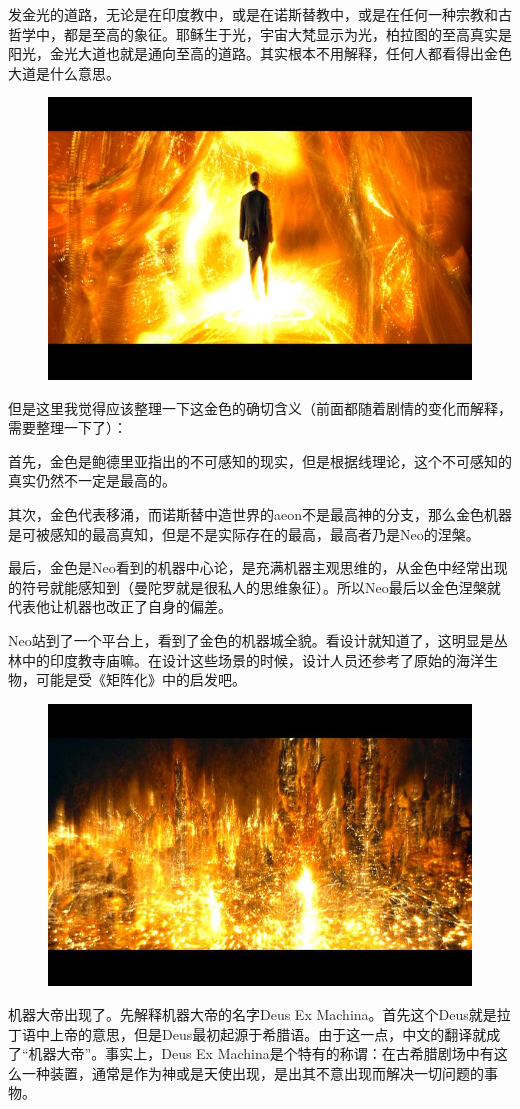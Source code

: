 \documentclass[UTF8]{ctexart}
\begin{document}
发金光的道路，无论是在印度教中，或是在诺斯替教中，或是在任何一种宗教和古哲学中，都是至高的象征。耶稣生于光，宇宙大梵显示为光，柏拉图的至高真实是阳光，金光大道也就是通向至高的道路。其实根本不用解释，任何人都看得出金色大道是什么意思。

\begin{figure}[htb]
\centering
\includegraphics[width=0.5\linewidth]{fig/3c153812db6aa550f819b8b1.jpg}
\end{figure}

但是这里我觉得应该整理一下这金色的确切含义（前面都随着剧情的变化而解释，需要整理一下了）：

首先，金色是鲍德里亚指出的不可感知的现实，但是根据线理论，这个不可感知的真实仍然不一定是最高的。

其次，金色代表移涌，而诺斯替中造世界的aeon不是最高神的分支，那么金色机器是可被感知的最高真知，但是不是实际存在的最高，最高者乃是Neo的涅槃。

最后，金色是Neo看到的机器中心论，是充满机器主观思维的，从金色中经常出现的符号就能感知到（曼陀罗就是很私人的思维象征）。所以Neo最后以金色涅槃就代表他让机器也改正了自身的偏差。

Neo站到了一个平台上，看到了金色的机器城全貌。看设计就知道了，这明显是丛林中的印度教寺庙嘛。在设计这些场景的时候，设计人员还参考了原始的海洋生物，可能是受《矩阵化》中的启发吧。

\begin{figure}[htb]
\centering
\includegraphics[width=0.5\linewidth]{fig/ac70b21bd920ed188618bfb1.jpg}
\end{figure}

机器大帝出现了。先解释机器大帝的名字Deus Ex Machina。首先这个Deus就是拉丁语中上帝的意思，但是Deus最初起源于希腊语。由于这一点，中文的翻译就成了“机器大帝”。事实上，Deus Ex Machina是个特有的称谓：在古希腊剧场中有这么一种装置，通常是作为神或是天使出现，是出其不意出现而解决一切问题的事物。
\end{document}
